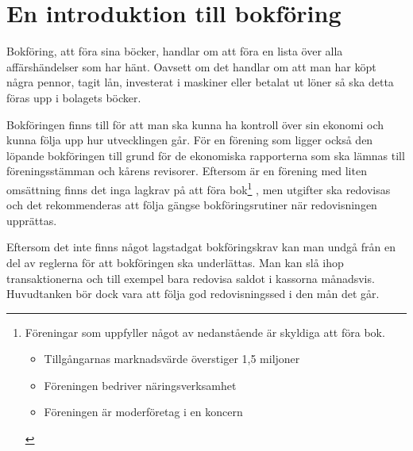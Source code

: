 \chapter{En introduktion till bokföring}
Bokföring, att föra sina böcker, handlar om att föra en lista över alla affärshändelser som har hänt. Oavsett om det handlar om att man har köpt några pennor, tagit lån, investerat i maskiner eller betalat ut löner så ska detta föras upp i bolagets böcker.

Bokföringen finns till för att man ska kunna ha kontroll över sin ekonomi och kunna följa upp hur utvecklingen går. För en förening som  ligger också den löpande bokföringen till grund för de ekonomiska rapporterna som ska lämnas till föreningsstämman och kårens revisorer. Eftersom  är en förening med liten omsättning finns det inga lagkrav på att föra bok\footnote{Föreningar som uppfyller något av nedanstående är skyldiga att föra bok.
	\begin{itemize}\itemsep1pt
		\item Tillgångarnas marknadsvärde överstiger 1,5 miljoner
		\item Föreningen bedriver näringsverksamhet
		\item Föreningen är moderföretag i en koncern
	\end{itemize}}
, men utgifter ska redovisas och det rekommenderas att följa gängse bokföringsrutiner när redovisningen upprättas.

Eftersom det inte finns något lagstadgat bokföringskrav kan man undgå från en del av reglerna för att bokföringen ska underlättas. Man kan slå ihop transaktionerna och till exempel bara redovisa saldot i kassorna månadsvis. Huvudtanken bör dock vara att följa god redovisningssed i den mån det går.



